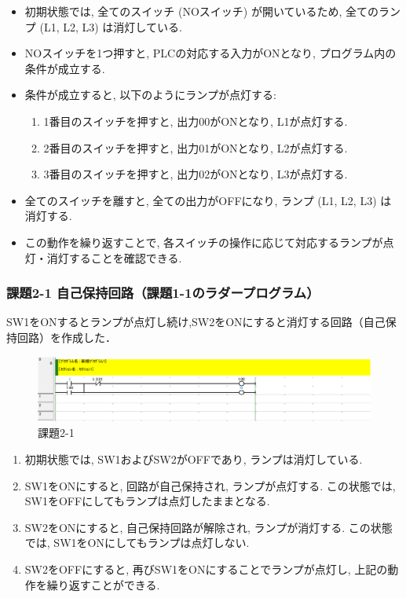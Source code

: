 \begin{itemize}
  \item 初期状態では, 全てのスイッチ (NOスイッチ) が開いているため, 全てのランプ (L1, L2, L3) は消灯している.
  \item NOスイッチを1つ押すと, PLCの対応する入力がONとなり, プログラム内の条件が成立する.
  \item 条件が成立すると, 以下のようにランプが点灯する:
        \begin{enumerate}
          \item 1番目のスイッチを押すと, 出力00がONとなり, L1が点灯する.
          \item 2番目のスイッチを押すと, 出力01がONとなり, L2が点灯する.
          \item 3番目のスイッチを押すと, 出力02がONとなり, L3が点灯する.
        \end{enumerate}
  \item 全てのスイッチを離すと, 全ての出力がOFFになり, ランプ (L1, L2, L3) は消灯する.
  \item この動作を繰り返すことで, 各スイッチの操作に応じて対応するランプが点灯・消灯することを確認できる.
\end{itemize}

\subsubsection*{課題2-1 自己保持回路（課題1-1のラダープログラム）}
SW1をONするとランプが点灯し続け,SW2をONにすると消灯する回路（自己保持回路）を作成した．

\begin{figure}[H]
  \centering
  \includegraphics[scale=1]{sozai/2-1-crop.pdf}
  \caption{課題2-1}
\end{figure}

\begin{enumerate}
  \item 初期状態では, SW1およびSW2がOFFであり, ランプは消灯している.
  \item SW1をONにすると, 回路が自己保持され, ランプが点灯する. この状態では, SW1をOFFにしてもランプは点灯したままとなる.
  \item SW2をONにすると, 自己保持回路が解除され, ランプが消灯する. この状態では, SW1をONにしてもランプは点灯しない.
  \item SW2をOFFにすると, 再びSW1をONにすることでランプが点灯し, 上記の動作を繰り返すことができる.
\end{enumerate}


